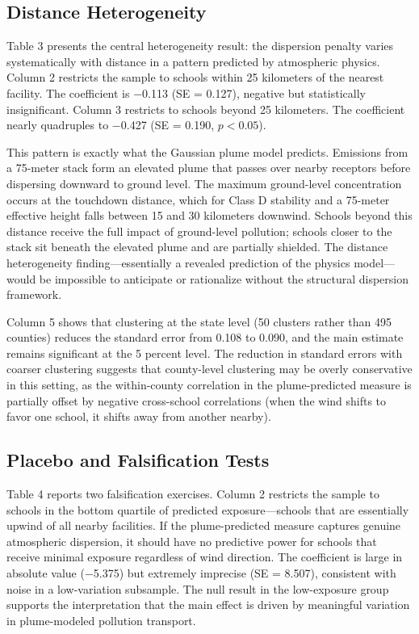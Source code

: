 \documentclass[12pt]{article}
\begin{document}
\subsection{Distance Heterogeneity}

{\footnotesize}

Table 3 presents the central heterogeneity result: the dispersion penalty varies systematically with distance in a pattern predicted by atmospheric physics. Column 2 restricts the sample to schools within 25 kilometers of the nearest facility. The coefficient is $-$0.113 (SE = 0.127), negative but statistically insignificant. Column 3 restricts to schools beyond 25 kilometers. The coefficient nearly quadruples to $-$0.427 (SE = 0.190, $p < 0.05$).

This pattern is exactly what the Gaussian plume model predicts. Emissions from a 75-meter stack form an elevated plume that passes over nearby receptors before dispersing downward to ground level. The maximum ground-level concentration occurs at the touchdown distance, which for Class D stability and a 75-meter effective height falls between 15 and 30 kilometers downwind. Schools beyond this distance receive the full impact of ground-level pollution; schools closer to the stack sit beneath the elevated plume and are partially shielded. The distance heterogeneity finding---essentially a revealed prediction of the physics model---would be impossible to anticipate or rationalize without the structural dispersion framework.

Column 5 shows that clustering at the state level (50 clusters rather than 495 counties) reduces the standard error from 0.108 to 0.090, and the main estimate remains significant at the 5 percent level. The reduction in standard errors with coarser clustering suggests that county-level clustering may be overly conservative in this setting, as the within-county correlation in the plume-predicted measure is partially offset by negative cross-school correlations (when the wind shifts to favor one school, it shifts away from another nearby).

\subsection{Placebo and Falsification Tests}

{\footnotesize}

Table 4 reports two falsification exercises. Column 2 restricts the sample to schools in the bottom quartile of predicted exposure---schools that are essentially upwind of all nearby facilities. If the plume-predicted measure captures genuine atmospheric dispersion, it should have no predictive power for schools that receive minimal exposure regardless of wind direction. The coefficient is large in absolute value ($-$5.375) but extremely imprecise (SE = 8.507), consistent with noise in a low-variation subsample. The null result in the low-exposure group supports the interpretation that the main effect is driven by meaningful variation in plume-modeled pollution transport.
\end{document}
